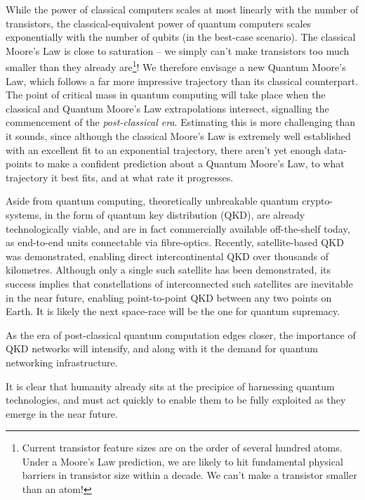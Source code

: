 While the power of classical computers scales at most linearly with the number of transistors, the classical-equivalent power of quantum computers scales exponentially with the number of qubits (in the best-case scenario). The classical Moore's Law is close to saturation -- we simply can't make transistors too much smaller than they already are\footnote{Current transistor feature sizes are on the order of several hundred atoms. Under a Moore's Law prediction, we are likely to hit fundamental physical barriers in transistor size within a decade. We can't make a transistor smaller than an atom!}! We therefore envisage a new Quantum Moore's Law, which follows a far more impressive trajectory than its classical counterpart. The point of critical mass in quantum computing will take place when the classical and Quantum Moore's Law extrapolations intersect, signalling the commencement of the \textit{post-classical era}. Estimating this is more challenging than it sounds, since although the classical Moore's Law is extremely well established with an excellent fit to an exponential trajectory, there aren't yet enough data-points to make a confident prediction about a Quantum Moore's Law, to what trajectory it best fits, and at what rate it progresses.

Aside from quantum computing, theoretically unbreakable quantum crypto-systems, in the form of quantum key distribution (QKD), are already technologically viable, and are in fact commercially available off-the-shelf today, as end-to-end units connectable via fibre-optics. Recently, satellite-based QKD was demonstrated, enabling direct intercontinental QKD over thousands of kilometres. Although only a single such satellite has been demonstrated, its success implies that constellations of interconnected such satellites are inevitable in the near future, enabling point-to-point QKD between any two points on Earth. It is likely the next space-race will be the one for quantum supremacy.

As the era of post-classical quantum computation edges closer, the importance of QKD networks will intensify, and along with it the demand for quantum networking infrastructure.

It is clear that humanity already sits at the precipice of harnessing quantum technologies, and must act quickly to enable them to be fully exploited as they emerge in the near future.